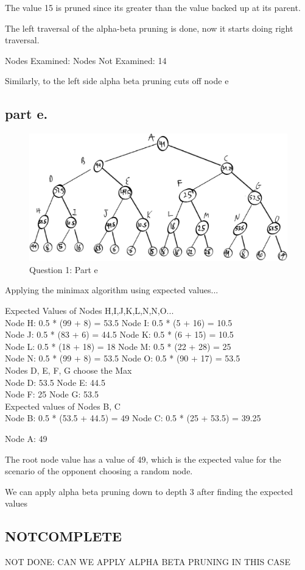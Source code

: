 The value 15 is pruned since its greater than the value backed up at its parent.

The left traversal of the alpha-beta pruning is done, now it starts doing right traversal.

Nodes Examined:
Nodes Not Examined: 14

Similarly, to the left side alpha beta pruning cuts off node e

\subsection{part e.}

\begin{figure}[H]
	\centering
  \includegraphics[scale = 0.70]{q1_part_e.png}
	\caption{Question 1: Part e}
	\label{fig: Q1 Part e}
\end{figure}

Applying the minimax algorithm using expected values...

\begin{center}
Expected Values of Nodes H,I,J,K,L,N,N,O... \\
Node H: 0.5 * (99 + 8)  = 53.5 \tab \tab
Node I: 0.5 * (5 + 16)  = 10.5 \\
Node J: 0.5 * (83 + 6)  = 44.5 \tab \tab
Node K: 0.5 * (6 + 15)  = 10.5 \\
Node L: 0.5 * (18 + 18) = 18   \tab \tab
Node M: 0.5 * (22 + 28) = 25   \\
Node N: 0.5 * (99 + 8)  = 53.5 \tab \tab
Node O: 0.5 * (90 + 17) = 53.5 \\

\newpage
Nodes D, E, F, G choose the Max \\
Node D: 53.5 \tab \tab
Node E: 44.5 \\
Node F: 25   \tab \tab
Node G: 53.5 \\

Expected values of Nodes B, C \\
Node B: 0.5 * (53.5 + 44.5) = 49 \tab \tab
Node C: 0.5 * (25 + 53.5)   = 39.25

Node A: 49
\end{center}

The root node value has a value of 49, which is the expected value for the scenario of the opponent
choosing a random node.

We can apply alpha beta pruning down to depth 3 after finding the expected values


\subsection{NOTCOMPLETE}
NOT DONE: CAN WE APPLY ALPHA BETA PRUNING IN THIS CASE
